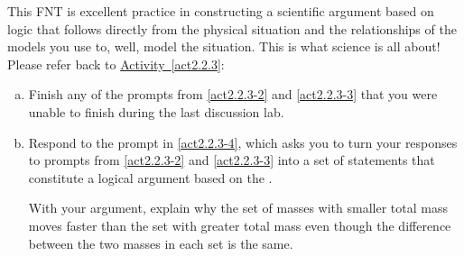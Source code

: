 \label{fnt2.2.3-1}

This FNT is excellent practice in constructing a scientific argument based on logic that follows directly from the physical situation and the relationships of the models you use to, well, model the situation. This is what science is all about!\\

\noindent Please refer back to \hyperref[act2.2.3]{Activity~\ref*{act2.2.3}}:

\begin{enumerate}[(a)]
	\item Finish any of the prompts from \ref{act2.2.3-2} and \ref{act2.2.3-3} that you were unable to finish during the last discussion lab.
	\label{fnt2.2.3-1a}
	
	\item  Respond to the prompt in \ref{act2.2.3-4}, which asks you to turn your responses to prompts from \ref{act2.2.3-2} and \ref{act2.2.3-3} into a set of statements that constitute a logical argument based on the \EnergyInteractionModel{}.
	
		With your argument, explain why the set of masses with smaller total mass moves faster than the set with greater total mass even though the difference between the two masses in each set is the same.
	\label{fnt2.2.3-1b}
\end{enumerate}